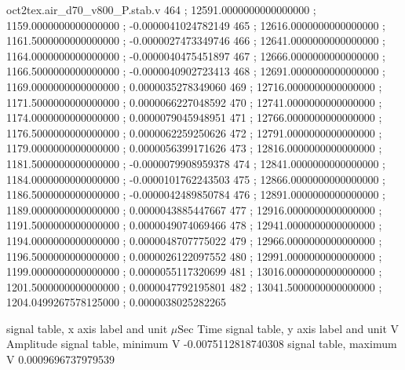 \begin{filecontents}[overwrite]{oct2tex.air_d70_v800_P.stab.v}
464 ; 12591.0000000000000000 ; 1159.0000000000000000 ; -0.0000041024782149
465 ; 12616.0000000000000000 ; 1161.5000000000000000 ; -0.0000027473349746
466 ; 12641.0000000000000000 ; 1164.0000000000000000 ; -0.0000040475451897
467 ; 12666.0000000000000000 ; 1166.5000000000000000 ; -0.0000040902723413
468 ; 12691.0000000000000000 ; 1169.0000000000000000 ; 0.0000035278349060
469 ; 12716.0000000000000000 ; 1171.5000000000000000 ; 0.0000066227048592
470 ; 12741.0000000000000000 ; 1174.0000000000000000 ; 0.0000079045948951
471 ; 12766.0000000000000000 ; 1176.5000000000000000 ; 0.0000062259250626
472 ; 12791.0000000000000000 ; 1179.0000000000000000 ; 0.0000056399171626
473 ; 12816.0000000000000000 ; 1181.5000000000000000 ; -0.0000079908959378
474 ; 12841.0000000000000000 ; 1184.0000000000000000 ; -0.0000101762243503
475 ; 12866.0000000000000000 ; 1186.5000000000000000 ; -0.0000042489850784
476 ; 12891.0000000000000000 ; 1189.0000000000000000 ; 0.0000043885447667
477 ; 12916.0000000000000000 ; 1191.5000000000000000 ; 0.0000049074069466
478 ; 12941.0000000000000000 ; 1194.0000000000000000 ; 0.0000048707775022
479 ; 12966.0000000000000000 ; 1196.5000000000000000 ; 0.0000026122097552
480 ; 12991.0000000000000000 ; 1199.0000000000000000 ; 0.0000055117320699
481 ; 13016.0000000000000000 ; 1201.5000000000000000 ; 0.0000047792195801
482 ; 13041.5000000000000000 ; 1204.0499267578125000 ; 0.0000038025282265
\end{filecontents}
\expandafter\def\csname oct2tex.air_d70_v800_P.stabxlbl.d\endcsname{signal table, x axis label and unit}
\expandafter\def\csname oct2tex.air_d70_v800_P.stabxlbl.u\endcsname{\ensuremath{\mu\text{Sec}}}
\expandafter\def\csname oct2tex.air_d70_v800_P.stabxlbl.v\endcsname{Time}
\expandafter\def\csname oct2tex.air_d70_v800_P.stabylbl.d\endcsname{signal table, y axis label and unit}
\expandafter\def\csname oct2tex.air_d70_v800_P.stabylbl.u\endcsname{\ensuremath{\text{V}}}
\expandafter\def\csname oct2tex.air_d70_v800_P.stabylbl.v\endcsname{Amplitude}
\expandafter\def\csname oct2tex.air_d70_v800_P.stabmin.d\endcsname{signal table, minimum}
\expandafter\def\csname oct2tex.air_d70_v800_P.stabmin.u\endcsname{\ensuremath{\text{V}}}
\expandafter\def\csname oct2tex.air_d70_v800_P.stabmin.v\endcsname{-0.0075112818740308}
\expandafter\def\csname oct2tex.air_d70_v800_P.stabmax.d\endcsname{signal table, maximum}
\expandafter\def\csname oct2tex.air_d70_v800_P.stabmax.u\endcsname{\ensuremath{\text{V}}}
\expandafter\def\csname oct2tex.air_d70_v800_P.stabmax.v\endcsname{0.0009696737979539}
